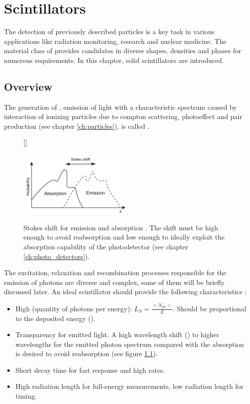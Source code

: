 \chapter{Scintillators} \label{ch:scintillators}
The detection of previously described particles is a key task in various applications like radiation monitoring, research and nuclear medicine. The material class of  provides candidates in diverse shapes, densities and phases for numerous requirements. In this chapter, solid scintillators are introduced.
\section{Overview}
The generation of , emission of light with a characteristic spectrum caused by interaction of ionizing particles due to compton scattering, photoeffect and pair production (see chapter \ref{ch:particles}), is called . 
\begin{figure}[b]
	[\FBwidth]
	{\caption[Stokes shift]{Stokes shift for emission and absorption \cite{wermes}. The shift must be high enough to avoid re\-absorption and low enough to ideally exploit the absorption capability of the photodetector (see chapter \ref{ch:photo_detectors}).}   
		\label{fig:ch2:stokes}}
	{\includegraphics[width=0.5\textwidth]{./graphics/ch2/stokes.png}}
\end{figure}
The excitation, relaxation and recombination processes responsible for the emission of photons are diverse and complex, some of them will be briefly discussed later. An ideal scintillator should provide the following characteristics \cite{wermes}:
\begin{itemize}
	\setlength{\itemsep}{0pt}
	\item High  (quantity of photons per energy): $L_S=\frac{<N_{ph}>}{E} \label{eq:light_yield}$. Should be proportional to the deposited energy (). 
	\item Transparency for emitted light. A high wavelength shift () to higher wavelengths for the emitted photon spectrum compared with the absorption is desired to avoid re\-absorption (see figure \ref{fig:ch2:stokes}).  
	\item Short decay time for fast response and high rates.
	\item High radiation length for full-energy measurements, low radiation length for timing.
\end{itemize}

